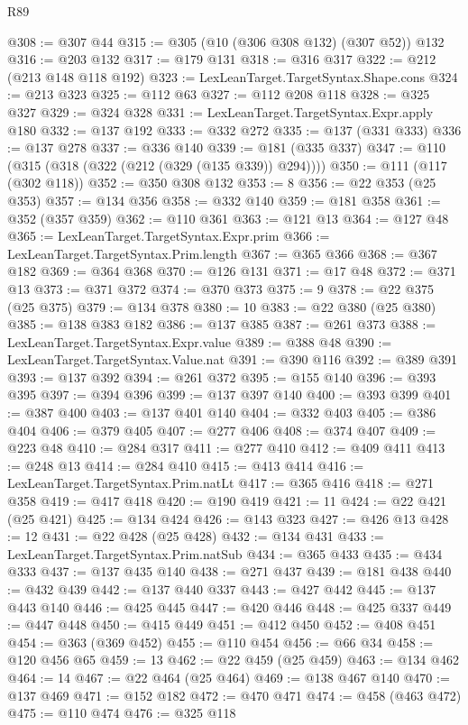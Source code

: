 \begin{lexlean}{R89}
\begin{coremodule}
@308 := @307 @44
@315 := @305 (@10 (@306 @308 @132) (@307 @52)) @132
@316 := @203 @132
@317 := @179 @131
@318 := @316 @317
@322 := @212 (@213 @148 @118 @192)
@323 := LexLeanTarget.TargetSyntax.Shape.cons
@324 := @213 @323
@325 := @112 @63
@327 := @112 @208 @118
@328 := @325 @327
@329 := @324 @328
@331 := LexLeanTarget.TargetSyntax.Expr.apply @180
@332 := @137 @192
@333 := @332 @272
@335 := @137 (@331 @333)
@336 := @137 @278
@337 := @336 @140
@339 := @181 (@335 @337)
@347 := @110 (@315 (@318 (@322 (@212 (@329 (@135 @339)) @294))))
@350 := @111 (@117 (@302 @118))
@352 := @350 @308 @132
@353 := 8
@356 := @22 @353 (@25 @353)
@357 := @134 @356
@358 := @332 @140
@359 := @181 @358
@361 := @352 (@357 @359)
@362 := @110 @361
@363 := @121 @13
@364 := @127 @48
@365 := LexLeanTarget.TargetSyntax.Expr.prim
@366 := LexLeanTarget.TargetSyntax.Prim.length
@367 := @365 @366
@368 := @367 @182
@369 := @364 @368
@370 := @126 @131
@371 := @17 @48
@372 := @371 @13
@373 := @371 @372
@374 := @370 @373
@375 := 9
@378 := @22 @375 (@25 @375)
@379 := @134 @378
@380 := 10
@383 := @22 @380 (@25 @380)
@385 := @138 @383 @182
@386 := @137 @385
@387 := @261 @373
@388 := LexLeanTarget.TargetSyntax.Expr.value
@389 := @388 @48
@390 := LexLeanTarget.TargetSyntax.Value.nat
@391 := @390 @116
@392 := @389 @391
@393 := @137 @392
@394 := @261 @372
@395 := @155 @140
@396 := @393 @395
@397 := @394 @396
@399 := @137 @397 @140
@400 := @393 @399
@401 := @387 @400
@403 := @137 @401 @140
@404 := @332 @403
@405 := @386 @404
@406 := @379 @405
@407 := @277 @406
@408 := @374 @407
@409 := @223 @48
@410 := @284 @317
@411 := @277 @410
@412 := @409 @411
@413 := @248 @13
@414 := @284 @410
@415 := @413 @414
@416 := LexLeanTarget.TargetSyntax.Prim.natLt
@417 := @365 @416
@418 := @271 @358
@419 := @417 @418
@420 := @190 @419
@421 := 11
@424 := @22 @421 (@25 @421)
@425 := @134 @424
@426 := @143 @323
@427 := @426 @13
@428 := 12
@431 := @22 @428 (@25 @428)
@432 := @134 @431
@433 := LexLeanTarget.TargetSyntax.Prim.natSub
@434 := @365 @433
@435 := @434 @333
@437 := @137 @435 @140
@438 := @271 @437
@439 := @181 @438
@440 := @432 @439
@442 := @137 @440 @337
@443 := @427 @442
@445 := @137 @443 @140
@446 := @425 @445
@447 := @420 @446
@448 := @425 @337
@449 := @447 @448
@450 := @415 @449
@451 := @412 @450
@452 := @408 @451
@454 := @363 (@369 @452)
@455 := @110 @454
@456 := @66 @34
@458 := @120 @456 @65
@459 := 13
@462 := @22 @459 (@25 @459)
@463 := @134 @462
@464 := 14
@467 := @22 @464 (@25 @464)
@469 := @138 @467 @140
@470 := @137 @469
@471 := @152 @182
@472 := @470 @471
@474 := @458 (@463 @472)
@475 := @110 @474
@476 := @325 @118

\end{coremodule}
\end{lexlean}
